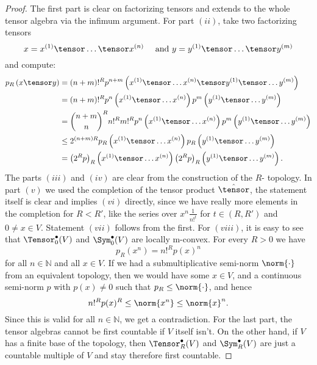 \begin{proof}
	The first part is clear on factorizing tensors and extends to the whole 
	tensor algebra via the infimum argument. For part $(ii)$, take two 
	factorizing tensors
	\begin{equation*}
		x
		=
		x^{(1)} \tensor \ldots \tensor x^{(n)}
		\quad \text{ and }
		y
		=
		y^{(1)} \tensor \ldots \tensor y^{(m)}
	\end{equation*}
	and compute:
	\begin{align*}
		p_R \left(
			x \tensor y
		\right)
		& =
		(n + m)!^R
		p^{n + m} \left(
			x^{(1)} \tensor \ldots x^{(n)}
			\tensor
			y^{(1)} \tensor \ldots y^{(m)}
		\right)
		\\
		& =
		(n + m)!^R
		p^n \left(
			x^{(1)} \tensor \ldots x^{(n)}
		\right)
		p^m \left(
			y^{(1)} \tensor \ldots y^{(m)}
		\right)
		\\
		& =
		\binom{n + m}{n}^R
		n!^R m!^R
		p^n \left(
			x^{(1)} \tensor \ldots x^{(n)}
		\right)
		p^m \left(
			y^{(1)} \tensor \ldots y^{(m)}
		\right)
		\\
		& \leq
		2^{(n + m) R}
		p_R \left( x^{(1)} \tensor \ldots x^{(n)} \right)
		p_R \left( y^{(1)} \tensor \ldots y^{(m)} \right)
		\\
		& =
		\left( 2^R p\right)_R 
		\left( x^{(1)} \tensor \ldots x^{(n)} \right)
		\left( 2^R p \right)_R 
		\left( y^{(1)} \tensor \ldots y^{(m)} \right).
	\end{align*}
	The parts $(iii)$ and $(iv)$ are clear from the construction of the $R$-
	topology. In part $(v)$ we used the completion of the tensor product 
	$\hat{\tensor}$, the statement itself is clear and implies $(vi)$ 
	directly, since we have really more elements in the completion for $R < 
	R'$, like the series over $x^{n} \frac{1}{n!^t}$ for $t \in (R, R')$ and 
	$0 \neq x \in V$. Statement $(vii)$ follows from the first. For $(viii)$, 
	it is easy to see that $\Tensor_0^{\bullet}(V)$ and $\Sym_0^{\bullet}(V)$ 
	are locally m-convex. For every $R > 0$ we have
	\begin{equation*}
		p_R \left(x^n \right)
		=
		n!^R
		p(x)^n
	\end{equation*}
	for all $n \in \mathbb{N}$ and all $x \in V$. If we had a 
	submultiplicative semi-norm $\norm{\cdot}$ from an equivalent topology, 
	then we would have some $x \in V$, and a continuous semi-norm $p$ with 
	$p(x) \neq 0$ such that $p_R \leq \norm{\cdot}$, and hence
	\begin{equation*}
		n!^R p(x)^R
		\leq
		\norm{x^n}
		\leq
		\norm{x}^n.
	\end{equation*}
	Since this is valid for all $n \in \mathbb{N}$, we get a contradiction.
	For the last part, the tensor algebras cannot be first countable if $V$ 
	itself isn't. On the other hand, if $V$ has a finite base of the topology, 
	then $\Tensor_R^{\bullet}(V)$ and $\Sym_R^{\bullet}(V)$ are just a 
	countable multiple of $V$ and stay therefore first countable.
\end{proof}
